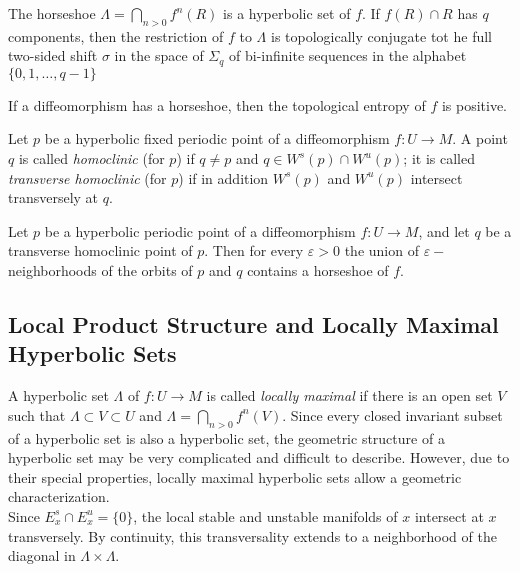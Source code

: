 \begin{thm}

The horseshoe $\Lambda=\bigcap_{n > 0}f^n(R)$ is a hyperbolic set of $f$. If $f(R)\cap R$ has $q$ components, then the restriction of $f$ to $\Lambda$ is topologically conjugate tot he full two-sided shift $\sigma$ in the space of $\Sigma_q$ of bi-infinite sequences in the alphabet $\{ 0,1,\ldots, q-1\}$

\end{thm}

\begin{cor}

If a diffeomorphism has a horseshoe, then the topological entropy of $f$ is positive.

\end{cor}

\indent Let $p$ be a hyperbolic fixed periodic point of a diffeomorphism $f:U \to M$. A point $q$ is called \textit{homoclinic} (for $p$) if $q \neq p$ and $q \in W^s(p) \cap W^u(p)$; it is called \textit{transverse homoclinic} (for $p$) if in addition $W^s(p)$ and $W^u(p)$ intersect transversely at $q$.

\begin{thm}

Let $p$ be a hyperbolic periodic point of a diffeomorphism $f:U \to M$, and let $q$ be a transverse homoclinic point of $p$. Then for every $\varepsilon >0 $ the union of $\varepsilon-$neighborhoods of the orbits of $p$ and $q$ contains a horseshoe of $f$.

\end{thm}

\subsection{Local Product Structure and Locally Maximal Hyperbolic Sets}

A hyperbolic set $\Lambda$ of $f: U \to M$ is called \textit{locally maximal} if there is an open set $V$ such that $\Lambda \subset V \subset U$ and $\Lambda=\bigcap_{n>0} f^n(V)$. Since every closed invariant subset of a hyperbolic set is also a hyperbolic set, the geometric structure of a hyperbolic set may be very complicated and difficult to describe. However, due to their special properties, locally maximal hyperbolic sets allow a geometric characterization. \\
\indent Since $E^s_x \cap E^u_x = \{0\}$, the local stable and unstable manifolds of $x$ intersect at $x$ transversely. By continuity, this transversality extends to a neighborhood of the diagonal in $\Lambda \times \Lambda$.

